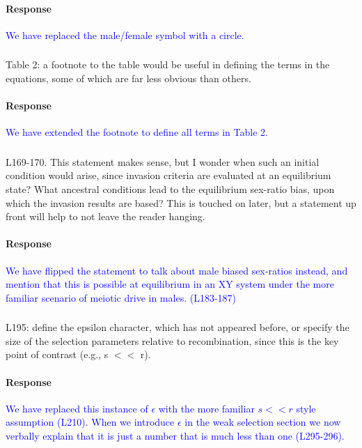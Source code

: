\documentclass[10pt,letterpaper]{article}
\begin{document}
\noindent\paragraph{Response}
\textcolor{blue}{We have replaced the male/female symbol with a circle.}

\noindent\subsubsection{}
Table 2: a footnote to the table would be useful in defining the terms in the equations, some of which are far less obvious than others.

\noindent\paragraph{Response}
\textcolor{blue}{We have extended the footnote to define all terms in Table 2.}

\noindent\subsubsection{}
L169-170. This statement makes sense, but I wonder when such an initial condition would arise, since invasion criteria are evaluated at an equilibrium state? What ancestral conditions lead to the equilibrium sex-ratio bias, upon which the invasion results are based? This is touched on later, but a statement up front will help to not leave the reader hanging.

\noindent\paragraph{Response}
\textcolor{blue}{We have flipped the statement to talk about male biased sex-ratios instead, and mention that this is possible at equilibrium in an XY system under the more familiar scenario of meiotic drive in males. (L183-187)}

\noindent\subsubsection{}
L195: define the epsilon character, which has not appeared before, or specify the size of the selection parameters relative to recombination, since this is the key point of contrast (e.g., s $<<$ r).

\noindent\paragraph{Response}
\textcolor{blue}{We have replaced this instance of $\epsilon$ with the more familiar $s<<r$ style assumption (L210). When we introduce $\epsilon$ in the weak selection section we now verbally explain that it is just a number that is much less than one (L295-296).}
\end{document}
